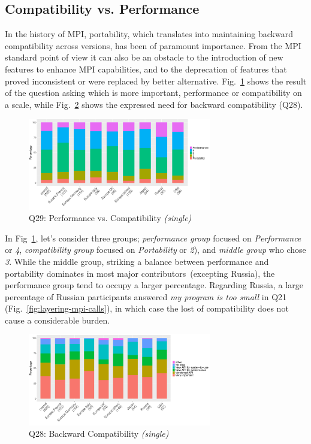 \documentclass[preprint,5p,times]{elsarticle}
\def\myquote#1{{\it #1}}
\def\mcountries{major contributors\xspace{}}%
\begin{document}
\subsection{Compatibility vs. Performance}

In the history of MPI, portability, which translates into maintaining backward
compatibility across versions, has been of paramount importance. From the MPI
standard point of view it can also be an obstacle to the introduction of new
features to enhance MPI capabilities, and to the deprecation of features that
proved inconsistent or were replaced by better alternative.
Fig.~\ref{fig:performance-vs-compatibility} shows the result of the question
asking which is more important, performance or compatibility on a scale, while
Fig.~\ref{fig:compatibility} shows the expressed need for backward compatibility
(Q28).

\begin{figure}[htb]
\begin{center}
\includegraphics[width=8.0cm]{R-scripts/Q29.pdf}
\vspace{-2mm}
\caption{Q29: Performance vs. Compatibility {\it(single)}}
\label{fig:performance-vs-compatibility}
\end{center}
\end{figure}

In Fig~\ref{fig:performance-vs-compatibility}, let's consider three groups; {\it
performance group} focused on \myquote{Performance} or \myquote{4}, {\it
compatibility group} focused on \myquote{Portability} or \myquote{2}), and {\it
middle group} who chose \myquote{3}. While the middle group, striking a balance
between performance and portability dominates in most \mcountries\  (excepting
Russia), the performance group tend to occupy a larger percentage. Regarding
Russia, a large percentage of Russian participants answered \myquote{my program
is too small} in Q21 (Fig.~\ref{fig:layering-mpi-calls}), in which case the lost
of compatibility does not cause a considerable burden.

\begin{figure}[htb]
\begin{center}
\includegraphics[width=8.0cm]{R-scripts/Q28.pdf}
\vspace{-2mm}
\caption{Q28: Backward Compatibility {\it(single)}}
\label{fig:compatibility}
\end{center}
\end{figure}
\end{document}
